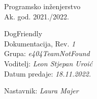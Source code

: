 \documentclass[12pt]{report}
\begin{document}
 
		
		\begin{titlepage}
			\begin{center}
				\LARGE Programsko inženjerstvo\\
				\large Ak. god. 2021./2022.\\
				
				
				\huge DogFriendly\\
				\Large Dokumentacija, Rev. \textit{1}\\
				
				\normalsize
				Grupa: \textit{e404TeamNotFound}\\
				Voditelj: \textit{Leon  Stjepan Uroić}\\
				
				
				Datum predaje: \textit{18.11.2022.}\\
				
				
				Nastavnik: \textit{Laura Majer}\\
				
			\end{center}
			
		\end{titlepage}
		
		\tableofcontents
		
		
		
		
		
		
		
		
		\begingroup
		\renewcommand*\listfigurename{Indeks slika i dijagrama}
		\renewcommand*\listtablename{Indeks tablica}
		\let\clearpage\relax
		\listoffigures
		\vspace{10mm}
		\listoftables
		\endgroup
		
		\eject 
		
		
		
	
\end{document}
